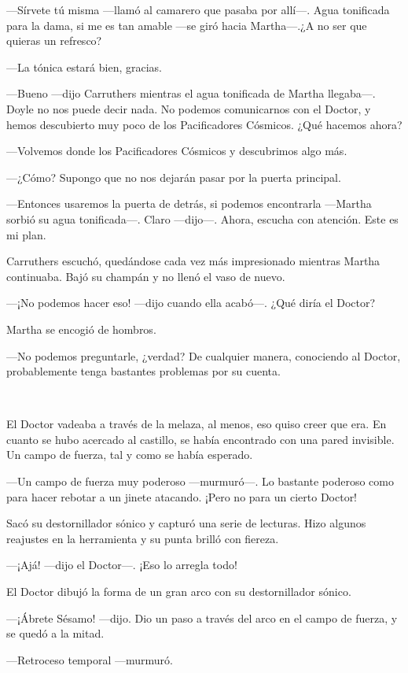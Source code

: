 ---Sírvete tú misma ---llamó al camarero que pasaba por allí---. Agua
tonificada para la dama, si me es tan amable ---se giró hacia
Martha---.¿A no ser que quieras un refresco?

---La tónica estará bien, gracias.

---Bueno ---dijo Carruthers mientras el agua tonificada de Martha
llegaba---. Doyle no nos puede decir nada. No podemos comunicarnos con
el Doctor, y hemos descubierto muy poco de los Pacificadores Cósmicos.
¿Qué hacemos ahora?

---Volvemos donde los Pacificadores Cósmicos y descubrimos algo más.

---¿Cómo? Supongo que no nos dejarán pasar por la puerta principal.

---Entonces usaremos la puerta de detrás, si podemos encontrarla
---Martha sorbió su agua tonificada---. Claro ---dijo---. Ahora, escucha
con atención. Este es mi plan.

Carruthers escuchó, quedándose cada vez más impresionado mientras Martha
continuaba. Bajó su champán y no llenó el vaso de nuevo.

---¡No podemos hacer eso! ---dijo cuando ella acabó---. ¿Qué diría el
Doctor?

Martha se encogió de hombros.

---No podemos preguntarle, ¿verdad? De cualquier manera, conociendo al
Doctor, probablemente tenga bastantes problemas por su cuenta.

~

El Doctor vadeaba a través de la melaza, al menos, eso quiso creer que
era. En cuanto se hubo acercado al castillo, se había encontrado con una
pared invisible. Un campo de fuerza, tal y como se había esperado.

---Un campo de fuerza muy poderoso ---murmuró---. Lo bastante poderoso
como para hacer rebotar a un jinete atacando. ¡Pero no para un cierto
Doctor!

Sacó su destornillador sónico y capturó una serie de lecturas. Hizo
algunos reajustes en la herramienta y su punta brilló con fiereza.

---¡Ajá! ---dijo el Doctor---. ¡Eso lo arregla todo!

El Doctor dibujó la forma de un gran arco con su destornillador sónico.

---¡Ábrete Sésamo! ---dijo. Dio un paso a través del arco en el campo de
fuerza, y se quedó a la mitad.

---Retroceso temporal ---murmuró.

